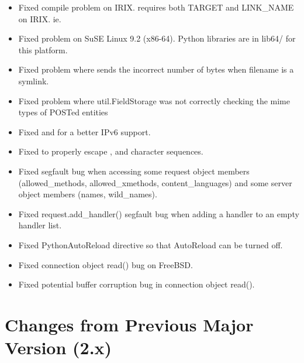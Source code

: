 \begin{itemize}
    \item 
      Fixed compile problem on IRIX.  requires both TARGET and LINK_NAME
      on IRIX. ie. 
    \item
      Fixed  problem on SuSE Linux 9.2 (x86-64). Python libraries
      are in lib64/ for this platform.
    \item
      Fixed  problem where  sends the incorrect
      number of bytes when filename is a symlink. 
    \item
      Fixed problem where util.FieldStorage was not correctly checking the mime
      types of POSTed entities
    \item
      Fixed  and  for a better IPv6 support. 
    \item
      Fixed  to properly escape , 
      and  character sequences. 
    \item
      Fixed segfault bug when accessing some request object members 
      (allowed_methods, allowed_xmethods, content_languages) and some server
      object members (names, wild_names).
    \item
      Fixed request.add_handler() segfault bug when adding a handler to an empty
      handler list.
    \item
      Fixed PythonAutoReload directive so that AutoReload can be turned off.
    \item
      Fixed connection object read() bug on FreeBSD.
    \item
      Fixed potential buffer corruption bug in connection object read().
\end{itemize}

\chapter{Changes from Previous Major Version (2.x)\label{app-changes}}


